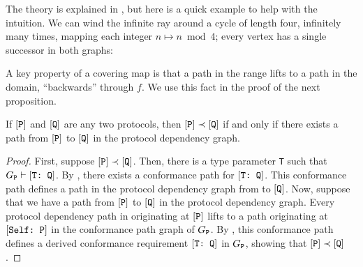 \documentclass[../generics]{subfiles}
\begin{document}
The theory is explained in \cite{godsil2001algebraic}, but here is a quick example to help with the intuition. We can wind the infinite ray around a cycle of length four, infinitely many times, mapping each integer $n\mapsto n \bmod 4$; every vertex has a single successor in both graphs:
\begin{center}
\end{center}
A key property of a covering map is that a path in the range lifts to a path in the domain, ``backwards'' through $f$. We use this fact in the proof of the next proposition.

\begin{proposition}
If $[\texttt{P}]$ and $[\texttt{Q}]$ are any two protocols, then $[\texttt{P}]\prec[\texttt{Q}]$ if and only if there exists a path from $[\texttt{P}]$ to $[\texttt{Q}]$ in the protocol dependency graph.
\end{proposition}
\begin{proof}
First, suppose $[\texttt{P}]\prec[\texttt{Q}]$. Then, there is a type parameter \texttt{T} such that $G_{\texttt{P}}\vdash[\texttt{T:~Q}]$. By , there exists a conformance path for $[\texttt{T:~Q}]$. This conformance path defines a path in the protocol dependency graph from  to $[\texttt{Q}]$. Now, suppose that we have a path from $[\texttt{P}]$ to $[\texttt{Q}]$ in the protocol dependency graph. Every protocol dependency path in originating at $[\texttt{P}]$ lifts to a path originating at $[\texttt{Self:~P}]$ in the conformance path graph of $G_{\texttt{P}}$. By , this conformance path defines a derived conformance requirement $[\texttt{T:~Q}]$ in $G_{\texttt{P}}$, showing that $[\texttt{P}]\prec[\texttt{Q}]$.
\end{proof}
\end{document}
